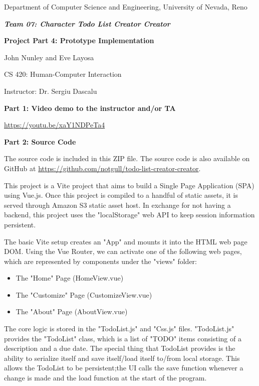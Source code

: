 \documentclass[12pt]{article}
\begin{document}
\begin{flushleft}

\begin{center}
Department of Computer Science and Engineering, University of Nevada, Reno

\textit{\textbf{Team 07: Character Todo List Creator Creator}}

\textbf{Project Part 4: Prototype Implementation}

John Nunley and Eve Layosa

CS 420: Human-Computer Interaction

Instructor: Dr. Sergiu Dascalu
\end{center}

\newpage


\setlength{\parindent}{0.5in}

\textbf{Part 1: Video demo to the instructor and/or TA}

\href{https://youtu.be/xaY1NDPeTa4}{https://youtu.be/xaY1NDPeTa4}

\textbf{Part 2: Source Code}

The source code is included in this ZIP file. The source code is also available on GitHub at \href{https://github.com/notgull/todo-list-creator-creator}{https://github.com/notgull/todo-list-creator-creator}.

This project is a Vite project that aims to build a Single Page Application (SPA) using Vue.js. Once this project is compiled to a handful of static assets, it is served through Amazon S3 static asset host. In exchange for not having a backend, this project uses the "localStorage" web API to keep session information persistent.

The basic Vite setup creates an "App" and mounts it into the HTML web page DOM. Using the Vue Router, we can activate one of the following web pages, which are represented by components under the "views" folder:

\begin{itemize}
    \item The "Home" Page (HomeView.vue)
    \item The "Customize" Page (CustomizeView.vue)
    \item The "About" Page (AboutView.vue)
\end{itemize}

The core logic is stored in the "TodoList.js" and "Css.js" files. "TodoList.js" provides the "TodoList" class, which is a list of "TODO" items consisting of a description and a due date. The special thing that TodoList provides is the ability to serialize itself and save itself/load itself to/from local storage. This allows the TodoList to be persistent;the UI calls the save function whenever a change is made and the load function at the start of the program.


\end{flushleft}
\end{document}
